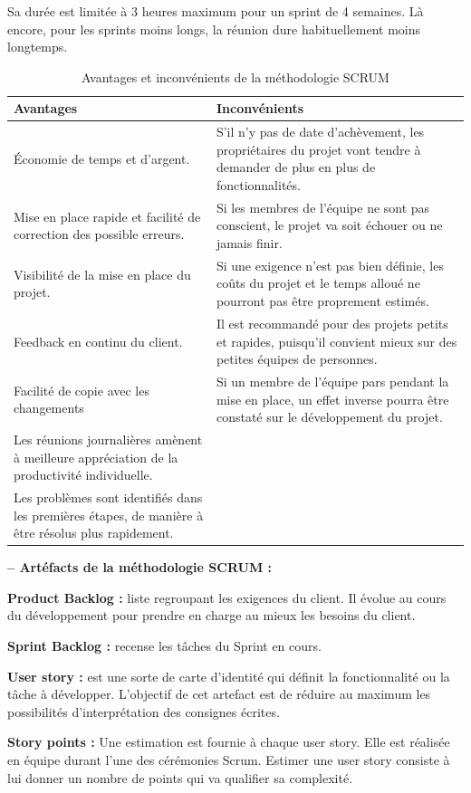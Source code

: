 \documentclass[a4paper, 12pt]{report}
\begin{document}
\begin{itemize}
Sa durée est limitée à 3 heures maximum pour un sprint de 4 semaines. Là encore, pour les sprints moins longs, la réunion dure habituellement moins longtemps.
\begin{table}[H]
\begin{tabular}{|p{6cm}|p{6cm}|} 
\hline  
\centering \textbf{Avantages} & \raggedright  \textbf{Inconvénients} \tabularnewline  
\hline
\raggedright Économie de temps et d'argent.  & S'il n'y pas de date d'achèvement, les propriétaires du projet vont tendre à demander de plus en plus de fonctionnalités.  \tabularnewline  
\hline  
\raggedright Mise en place rapide et facilité de correction des possible erreurs.  & Si les membres de l'équipe ne sont pas conscient, le projet va soit échouer ou ne jamais finir. \tabularnewline
\hline
\raggedright Visibilité de la mise en place du projet.  &  Si une exigence n'est pas bien définie, les coûts du projet et le temps alloué ne pourront pas être proprement estimés.   \tabularnewline
\hline
\raggedright Feedback en continu du client.  & Il est recommandé pour des projets petits et rapides, puisqu'il convient mieux sur des petites équipes de personnes. \tabularnewline
\hline
\raggedright Facilité de copie avec les changements & Si un membre de l'équipe pars pendant la mise en place, un effet inverse pourra être constaté sur le développement du projet. \tabularnewline
\hline
\raggedright Les réunions journalières amènent à meilleure appréciation de la productivité individuelle. &  \tabularnewline
\hline
\raggedright Les problèmes sont identifiés dans les premières étapes, de manière à être résolus plus rapidement. &  \tabularnewline
\hline
\end{tabular}
\caption{Avantages et inconvénients de la méthodologie SCRUM }
\end{table}
 
\textbf{-- Artéfacts de la méthodologie SCRUM :}

\textbf{Product Backlog :} liste regroupant les exigences du client. Il évolue au cours du développement pour prendre  en charge au mieux les besoins du client. 

\textbf{Sprint Backlog :} recense les tâches du Sprint en cours. 

\textbf{User story :} est une sorte de carte d’identité qui définit la  fonctionnalité ou la tâche à développer. L’objectif de cet artefact est  de réduire au maximum les possibilités d’interprétation des consignes  écrites. 

\textbf{Story points :} Une estimation est fournie à chaque user story. Elle est réalisée en équipe durant l’une des cérémonies Scrum. Estimer une user story consiste à lui donner un nombre de points qui va qualifier sa complexité. 


\end{itemize}
\end{document}
